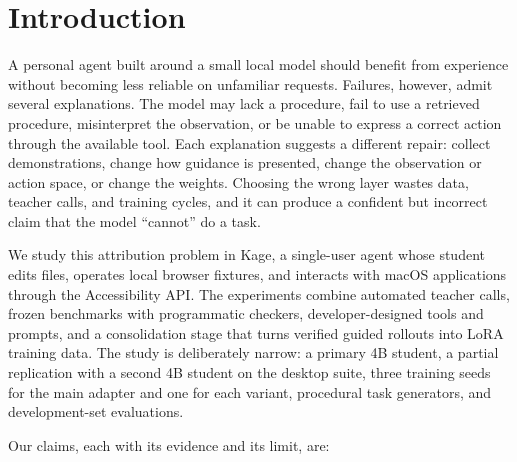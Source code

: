 \documentclass[
  10pt,
]{article}
\begin{document}
\section{Introduction}\label{introduction}

A personal agent built around a small local model should benefit from
experience without becoming less reliable on unfamiliar requests.
Failures, however, admit several explanations. The model may lack a
procedure, fail to use a retrieved procedure, misinterpret the
observation, or be unable to express a correct action through the
available tool. Each explanation suggests a different repair: collect
demonstrations, change how guidance is presented, change the observation
or action space, or change the weights. Choosing the wrong layer wastes
data, teacher calls, and training cycles, and it can produce a confident
but incorrect claim that the model ``cannot'' do a task.

We study this attribution problem in Kage, a single-user agent whose
student edits files, operates local browser fixtures, and interacts with
macOS applications through the Accessibility API. The experiments
combine automated teacher calls, frozen benchmarks with programmatic
checkers, developer-designed tools and prompts, and a consolidation
stage that turns verified guided rollouts into LoRA training data. The
study is deliberately narrow: a primary 4B student, a partial
replication with a second 4B student on the desktop suite, three
training seeds for the main adapter and one for each variant, procedural
task generators, and development-set evaluations.

Our claims, each with its evidence and its limit, are:
\end{document}
